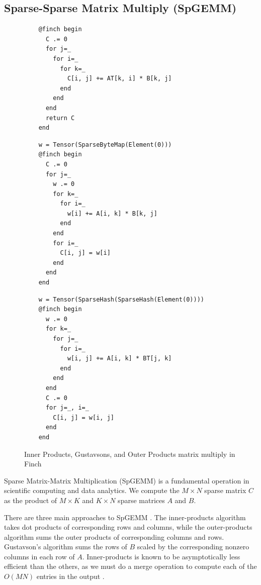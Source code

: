 \subsection{Sparse-Sparse Matrix Multiply (SpGEMM)}
\begin{figure}
    \begin{minipage}{0.333\linewidth}
    \begin{verbatim}
    @finch begin
      C .= 0
      for j=_
        for i=_
          for k=_
            C[i, j] += AT[k, i] * B[k, j]
          end
        end
      end
      return C
    end
    \end{verbatim}
    \end{minipage}%
    \begin{minipage}{0.333\linewidth}
    \begin{verbatim}
    w = Tensor(SparseByteMap(Element(0)))
    @finch begin
      C .= 0
      for j=_
        w .= 0
        for k=_
          for i=_
            w[i] += A[i, k] * B[k, j]
          end
        end
        for i=_
          C[i, j] = w[i]
        end
      end
    end
    \end{verbatim}
    \end{minipage}%
    \begin{minipage}{0.333\linewidth}
    \begin{verbatim}
    w = Tensor(SparseHash(SparseHash(Element(0))))
    @finch begin
      w .= 0
      for k=_
        for j=_
          for i=_
            w[i, j] += A[i, k] * BT[j, k]
          end
        end
      end
      C .= 0
      for j=_, i=_
        C[i, j] = w[i, j]
      end
    end
    \end{verbatim}
    \end{minipage}
    \vspace{-12pt}
    \caption{Inner Products, Gustavsons, and Outer Products matrix multiply in Finch}\label{fig:spgemm_listing}
    \vspace{-12pt}
\end{figure}

Sparse Matrix-Matrix Multiplication (SpGEMM) is a fundamental operation in scientific computing and data analytics. 
We compute the $M \times N$ sparse matrix $C$ as the product of $M \times K$ and $K \times N$ sparse matrices $A$ and $B$.

There are three main approaches to SpGEMM \cite[Section 2.2]{zhang2021gamma}.
%
The inner-products algorithm takes dot products of corresponding rows and columns, while the outer-products algorithm sums the outer products of corresponding columns and rows.
%
Gustavson's algorithm sums the rows of $B$ scaled by the corresponding nonzero columns in each row of $A$.
%
Inner-products is known to be asymptotically less efficient than the others, as we must do a merge operation to compute each of the $O(MN)$ entries in the output \cite{ahrens2022autoscheduling}.

